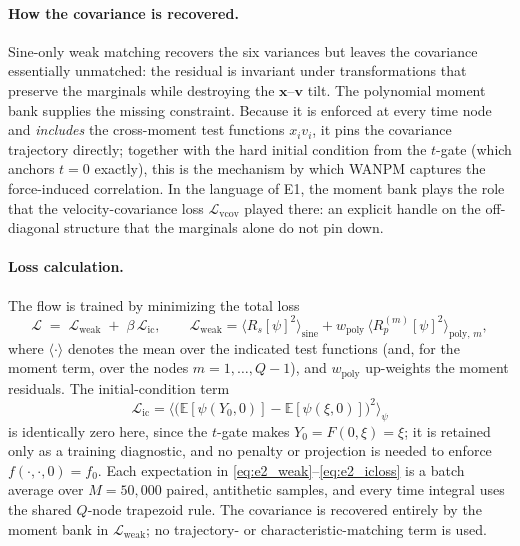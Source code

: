 \documentclass[11pt]{article}
\newcommand{\E}{\mathbb{E}}
\newcommand{\vx}{\mathbf{x}}
\newcommand{\vv}{\mathbf{v}}
\theoremstyle{plain}
\begin{document}
\paragraph{How the covariance is recovered.}
Sine-only weak matching recovers the six variances but leaves the covariance essentially unmatched: the residual is invariant under transformations that preserve the marginals while destroying the $\vx$--$\vv$ tilt. The polynomial moment bank supplies the missing constraint. Because it is enforced at every time node and \emph{includes} the cross-moment test functions $x_i v_i$, it pins the covariance trajectory directly; together with the hard initial condition from the $t$-gate (which anchors $t=0$ exactly), this is the mechanism by which WANPM captures the force-induced correlation. In the language of E1, the moment bank plays the role that the velocity-covariance loss $\mathcal L_{\mathrm{vcov}}$ played there: an explicit handle on the off-diagonal structure that the marginals alone do not pin down.

\paragraph{Loss calculation.}
The flow is trained by minimizing the total loss
\begin{equation}
\mathcal L \;=\; \mathcal L_{\mathrm{weak}} \;+\; \beta\,\mathcal L_{\mathrm{ic}},
\qquad
\mathcal L_{\mathrm{weak}}
=\big\langle R_s[\psi]^2\big\rangle_{\text{sine}}
+ w_{\mathrm{poly}}\,\big\langle R_p^{(m)}[\psi]^2\big\rangle_{\text{poly},\,m},
\label{eq:e2_loss}
\end{equation}
where $\langle\cdot\rangle$ denotes the mean over the indicated test functions (and, for the moment term, over the nodes $m=1,\dots,Q-1$), and $w_{\mathrm{poly}}$ up-weights the moment residuals. The initial-condition term
\begin{equation}
\mathcal L_{\mathrm{ic}}
=\big\langle\big(\E[\psi(Y_0,0)]-\E[\psi(\xi,0)]\big)^2\big\rangle_{\psi}
\label{eq:e2_icloss}
\end{equation}
is identically zero here, since the $t$-gate makes $Y_0=F(0,\xi)=\xi$; it is retained only as a training diagnostic, and no penalty or projection is needed to enforce $f(\cdot,\cdot,0)=f_0$. Each expectation in \eqref{eq:e2_weak}--\eqref{eq:e2_icloss} is a batch average over $M=50{,}000$ paired, antithetic samples, and every time integral uses the shared $Q$-node trapezoid rule. The covariance is recovered entirely by the moment bank in $\mathcal L_{\mathrm{weak}}$; no trajectory- or characteristic-matching term is used.
\end{document}

